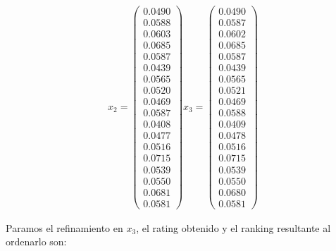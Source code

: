\begin{equation*}
\begin{array}{cccc}
	x_{2} = 
	\left( \begin{array}{c}
    0.0490\\
    0.0588\\
    0.0603\\
    0.0685\\
    0.0587\\
    0.0439\\
    0.0565\\
    0.0520\\
    0.0469\\
    0.0587\\
    0.0408\\
    0.0477\\
    0.0516\\
    0.0715\\
    0.0539\\
    0.0550\\
    0.0681\\
    0.0581
	\end{array}\right)	
	
	x_{3} = 
	\left( \begin{array}{c}
    0.0490\\
    0.0587\\
    0.0602\\
    0.0685\\
    0.0587\\
    0.0439\\
    0.0565\\
    0.0521\\
    0.0469\\
    0.0588\\
    0.0409\\
    0.0478\\
    0.0516\\
    0.0715\\
    0.0539\\
    0.0550\\
    0.0680\\
    0.0581
	\end{array}\right)
		
	
	\end{array}
	\end{equation*}
	
	Paramos el refinamiento en $x_{3}$, el rating obtenido y el ranking resultante al ordenarlo son:
	
